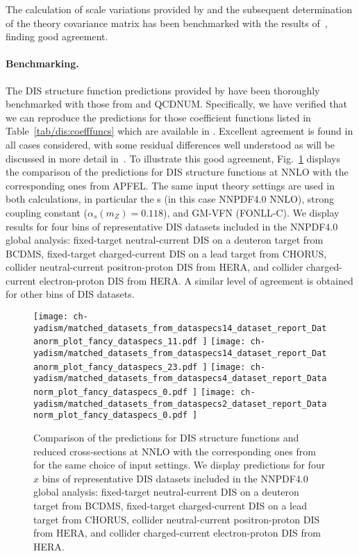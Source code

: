The calculation of scale variations provided by \yadism and the subsequent
determination of the \mhou theory covariance matrix has been benchmarked with
the results of~\cite{NNPDF:2019ubu}, finding good agreement.

\paragraph{Benchmarking.}
%
The DIS structure function predictions provided by \yadism have been thoroughly
benchmarked  with those from \apfel and \textsc{\small QCDNUM}.
%
Specifically, we have verified that we can reproduce the \apfel
predictions for those coefficient functions listed in
Table~\ref{tab/dis:coefffuncs} which are available in \apfel.
%
Excellent agreement is found in all cases considered, with some residual
differences well understood as will be discussed in more detail
in~\cite{yadism}.
%
To illustrate this good agreement, Fig.~\ref{fig/dis:benchmark-apfel-yadism}
displays the comparison of the \yadism predictions for DIS
structure functions at NNLO with the corresponding ones from \textsc{\small
APFEL}.
%
The same input theory settings are used in both calculations, in particular the
\pdf{}s (in this case NNPDF4.0 NNLO), strong coupling constant
($\alpha_s(m_Z)=0.118$), and GM-VFN (FONLL-C).
%
We display results for four bins of representative DIS datasets included in the
NNPDF4.0 global analysis: fixed-target neutral-current DIS on a deuteron target
from BCDMS, fixed-target charged-current DIS on a lead target from CHORUS,
collider neutral-current positron-proton DIS from HERA, and collider
charged-current electron-proton DIS from HERA.
%
A similar level of agreement is obtained for other bins of DIS datasets.

\begin{figure}[!t]
  \centering
  \texttt{[image: 
    ch-yadism/matched\_datasets\_from\_dataspecs14\_dataset\_report\_Datanorm\_plot\_fancy\_dataspecs\_11.pdf
  ]}
  \texttt{[image: 
    ch-yadism/matched\_datasets\_from\_dataspecs14\_dataset\_report\_Datanorm\_plot\_fancy\_dataspecs\_23.pdf
  ]}
  \texttt{[image: 
    ch-yadism/matched\_datasets\_from\_dataspecs4\_dataset\_report\_Datanorm\_plot\_fancy\_dataspecs\_0.pdf
  ]}
  \texttt{[image: 
    ch-yadism/matched\_datasets\_from\_dataspecs2\_dataset\_report\_Datanorm\_plot\_fancy\_dataspecs\_0.pdf
  ]}
  \caption{
    Comparison of the \yadism predictions for DIS structure
    functions and reduced cross-sections at NNLO with the corresponding ones
    from \apfel for the same choice of input settings.
    We display  predictions for four $x$ bins of representative DIS datasets
    included in the NNPDF4.0 global analysis: fixed-target neutral-current DIS
    on a deuteron target from BCDMS, fixed-target charged-current DIS on a lead
    target from CHORUS, collider neutral-current positron-proton DIS from HERA,
    and collider charged-current electron-proton DIS from HERA.
  }    
  \label{fig/dis:benchmark-apfel-yadism}
\end{figure}
